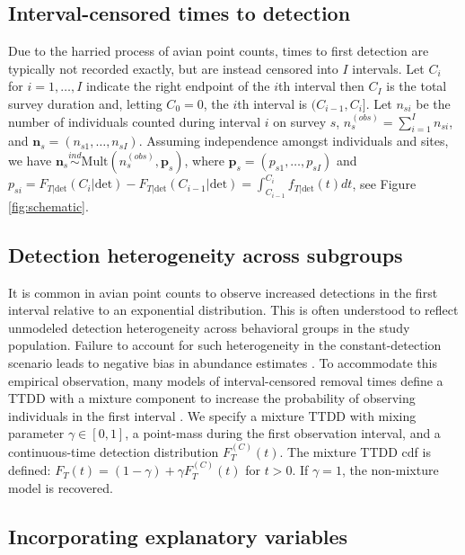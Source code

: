 \documentclass[12pt]{article}
\newcommand{\vn}{\textbf{n}}
\newcommand{\vp}{\textbf{p}}
\newcommand{\Mult}{\mbox{Mult}}
\newcommand{\ind}{\stackrel{ind}{\sim}}
\newcommand{\Fm}{F_T^{(C)}}
\newcommand{\dt}{\text{det}}
\newcommand{\nobs}{n^{(obs)}}
\begin{document}
\subsection{Interval-censored times to detection} \label{s:interval}

Due to the harried process of avian point counts, times to first detection are typically not recorded exactly, but are instead censored into $I$ intervals. 
Let $C_i$ for $i=1,\dots,I$ indicate the right endpoint of the $i$th interval then $C_I$ is the total survey duration and, letting $C_0=0$, the $i$th interval is $(C_{i-1},C_{i}]$. 
Let $n_{si}$ be the number of individuals counted during interval $i$ on survey $s$, $\nobs_s = \sum_{i=1}^I n_{si}$, and $\vn_{s}=(n_{s1},\dots,n_{sI})$.
Assuming independence amongst individuals and sites, we have $\vn_{s} \ind \Mult \left(\nobs_s, \vp_{s}\right)$, where $\vp_{s}=(p_{s1},\dots,p_{sI})$ and $p_{si} = F_{T|\dt}(C_i|\dt) - F_{T|\dt}(C_{i-1}|\dt) = \int_{C_{i-1}}^{C_i} f_{T|\dt}(t) dt$, 
see Figure \ref{fig:schematic}.  

\subsection{Detection heterogeneity across subgroups} \label{s:subgroups}

It is common in avian point counts to observe increased detections in the first interval relative to an exponential distribution.
This is often understood to reflect unmodeled detection heterogeneity across behavioral groups in the study population.
Failure to account for such heterogeneity in the constant-detection scenario leads to negative bias in abundance estimates \citep{Otis1978}.
To accommodate this empirical observation, many models of interval-censored removal times define a TTDD with a mixture component to increase the probability of observing individuals in the first interval \citep{Farnsworth2002, Royle2004Generalized, Farnsworth2005, Alldredge2007, Etterson2009, Reidy2011}.
We specify a mixture TTDD with mixing parameter $\gamma\in[0,1]$, a point-mass during the first observation interval, and a continuous-time detection distribution $\Fm(t)$.
The mixture TTDD cdf is defined: $F_T(t) = (1-\gamma) + \gamma \Fm(t)$ for $t>0$.
If $\gamma=1$, the non-mixture model is recovered.





\subsection{Incorporating explanatory variables}\label{sec:covariates}
\end{document}
